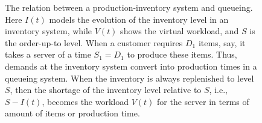 \documentclass[queueing-book.tex]{subfiles}
\begin{document}
\begin{figure}[t]
\begin{center}
\caption{
The relation between a production-inventory system and queueing. Here $I(t)$ models the evolution of the inventory level in an inventory system, while $V(t)$ shows the virtual workload, and $S$ is the order-up-to level. When a customer requires $D_1$ items, say, it takes a server of a time $S_1=D_1$ to produce these items. Thus, demands at the inventory system convert into production times in a queueing system. When the inventory is always replenished to level $S$, then the shortage of the inventory level relative to $S$, i.e., $S-I(t)$, becomes the workload $V(t)$ for the server in terms of amount of items or production time.} \label{fig:inv_queue}
\end{center}
\end{figure}




\end{document}
